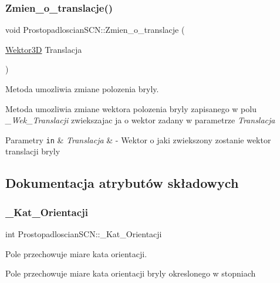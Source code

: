 \subsubsection{\texorpdfstring{Zmien\+\_\+o\+\_\+translacje()}{Zmien\_o\_translacje()}}
{\footnotesize\ttfamily void Prostopadloscian\+S\+C\+N\+::\+Zmien\+\_\+o\+\_\+translacje (\begin{DoxyParamCaption}\item[{\hyperlink{classSWektor}{Wektor3D}}]{Translacja }\end{DoxyParamCaption})\hspace{0.3cm}{\ttfamily [inline]}}



Metoda umozliwia zmiane polozenia bryly. 

Metoda umozliwia zmiane wektora polozenia bryly zapisanego w polu {\itshape \+\_\+\+Wek\+\_\+\+Translacji} zwiekszajac ja o wektor zadany w parametrze {\itshape Translacja} 


\begin{DoxyParams}[1]{Parametry}
\mbox{\tt in}  & {\em Translacja} & -\/ Wektor o jaki zwiekszony zostanie wektor translacji bryly \\
\hline
\end{DoxyParams}


\subsection{Dokumentacja atrybutów składowych}
\mbox{\label{classProstopadloscianSCN_ab47d8efc8b2817cabf5ea70915a8f5dc}} 
\subsubsection{\texorpdfstring{\+\_\+\+Kat\+\_\+\+Orientacji}{\_Kat\_Orientacji}}
{\footnotesize\ttfamily int Prostopadloscian\+S\+C\+N\+::\+\_\+\+Kat\+\_\+\+Orientacji\hspace{0.3cm}{\ttfamily [private]}}



Pole przechowuje miare kata orientacji. 

Pole przechowuje miare kata orientacji bryly okreslonego w stopniach \mbox{\label{classProstopadloscianSCN_ab6ed51a7c62d80bca489497ad60a861c}} 
